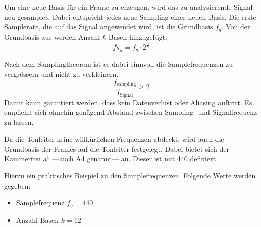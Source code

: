 \def\fs{\textit{fs}}

Um eine neue Basis für ein Frame zu erzeugen, wird das zu analysierende Signal neu gesamplet. Dabei entspricht jedes neue Sampling einer neuen Basis. Die erste Samplerate, die auf das Signal angewendet wird, ist die Grundbasis $f_{g}$. Von der Grundbasis aus werden Anzahl $k$ Basen hinzugefügt.
\[\fs_{n}=f_{g}\cdot2^{\frac{n}{k}}\]

Nach dem Samplingtheorem ist es dabei sinnvoll die Samplefrequenzen zu vergrössern und nicht zu verkleinern.
\[ \frac{f_{\text{sampling}}}{f_{\text{Signal}}} \geq 2\]
Damit kann garantiert werden, dass kein Datenverlust oder Aliasing auftritt. Es empfiehlt sich ohnehin genügend Abstand zwischen Sampling- und Signalfrequenz zu lassen.

Da die Tonleiter keine willkürlichen Frequenzen abdeckt, wird auch die Grundbasis der Frames auf die Tonleiter festgelegt. Dabei bietet sich der Kammerton $\text{a}^{1}$ ---auch A4 genannt--- an. Dieser ist mit 440 \text{[Hz]} definiert.




Hierzu ein praktisches Beispiel zu den Samplefrequenzen. Folgende Werte werden gegeben:
\begin{itemize}
	\item Samplefrequenz $f_{g}=440$\,\text{[Hz]}
	\item Anzahl Basen $k=12$
\end{itemize}	

